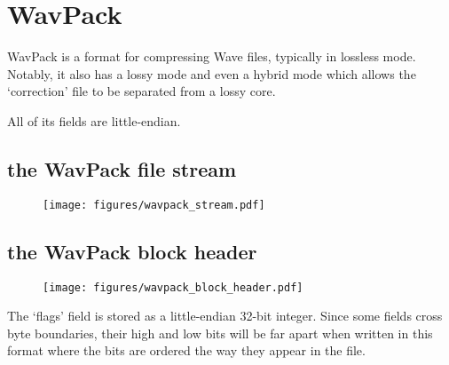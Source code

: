 \chapter{WavPack}
WavPack is a format for compressing Wave files, typically in lossless mode.
Notably, it also has a lossy mode and even a hybrid mode which allows
the `correction' file to be separated from a lossy core.

All of its fields are little-endian.

\section{the WavPack file stream}
\begin{figure}[h]
\texttt{[image: figures/wavpack\_stream.pdf]}
\end{figure}

\pagebreak

\section{the WavPack block header}
\begin{figure}[h]
\texttt{[image: figures/wavpack\_block\_header.pdf]}
\end{figure}
The `flags' field is stored as a little-endian 32-bit integer.
Since some fields cross byte boundaries, their high and low bits
will be far apart when written in this format where the bits are
ordered the way they appear in the file.

